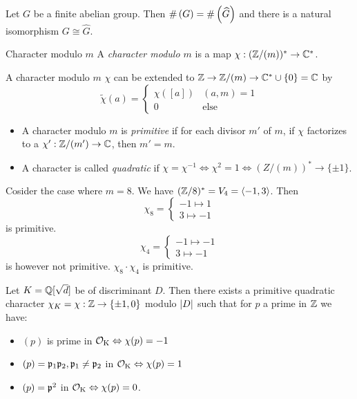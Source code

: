 \documentclass[12pt, a4paper]{article}
\begin{document}
	\begin{rem}
		Let $G$ be a finite abelian group. Then $\operatorname{\#}\left(G \right) = \operatorname{\#}\left(\widehat G \right)$ and there is a natural 
		isomorphism $G \cong \widehat G$.
	\end{rem}

	\begin{Def}{Character modulo $m$}{}
		A \emph{character modulo $m$} is a map $\chi: (\mathbb{Z} / (m))^* \to \mathbb{C}^*$.
	\end{Def}

	\begin{rem}
		A character modulo $m$ $\chi$ can be extended to $\mathbb{Z} \to \mathbb{Z} / (m) \to \mathbb{C}^* \cup \{0\} = \mathbb{C}$
		by 
		$$\tilde\chi(a) = \begin{cases}
			\chi([a]) & (a, m) = 1 \\
			0 & \text{else}
		\end{cases}$$
	\end{rem}

	\begin{Def}{}{}
		\begin{itemize}
		\item 
		A character modulo $m$ is \emph{primitive} if for each divisor $m'$ of $m$, if 
		$\chi$ factorizes to a $\chi': \mathbb{Z} / (m') \to \mathbb{C}$, then $m' = m$.
		\item 
		A character is called \emph{quadratic} if $\chi = \chi^{-1} \iff \chi^2 = 1 
		\iff (Z/(m))^* \to \{\pm 1\} $. 
		\end{itemize}
	\end{Def}

	\begin{ex}
		Cosider the case where $m = 8$.	We have $(\mathbb{Z} / 8)^* = V_4 = \langle -1, 3 \rangle$. Then 
		$$\chi_8 = \begin{cases} -1 \mapsto 1 \\ 
							3 \mapsto -1
				   \end{cases}$$
		is primitive.
		$$\chi_4 = \begin{cases} -1 \mapsto -1 \\ 
							3 \mapsto -1
				   \end{cases}$$
		is however not primitive.
		$\chi_8 \cdot \chi_4$ is primitive.
	\end{ex}

	\begin{thm}{}{}
		Let $K = \mathbb{Q}[\sqrt{d}]$ be of discriminant $D$. Then there exists a primitive quadratic 
		character $\chi_K = \chi : \mathbb{Z} \to \{\pm 1, 0\} $ modulo $\lvert D \rvert$ such that 
		for $p$ a prime in $\mathbb{Z}$ we have: 
		\begin{itemize}
			\item $(p)$ is prime in $\operatorname{\mathcal{O}_K} \Leftrightarrow \chi(p) = -1$
			\item $(p) = \mathfrak{p}_1 \mathfrak{p}_2, \mathfrak{p}_1 \neq \mathfrak{p}_2$ in $\operatorname{\mathcal{O}_K} \Leftrightarrow \chi(p) = 1$
			\item $(p) = \mathfrak{p}^2$ in $\operatorname{\mathcal{O}_K} \Leftrightarrow \chi(p) = 0$.
		\end{itemize}
	\end{thm}
\end{document}
